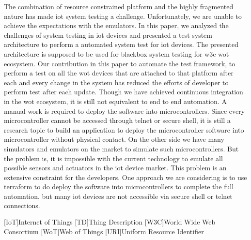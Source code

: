\documentclass[conference]{IEEEtran}
\theoremstyle{definition}
\begin{document}
The combination of resource constrained platform and the highly fragmented nature has made \ac{iot} system testing a challenge.
Unfortunately, we are unable to achieve the expectations with the emulators.
In this paper, we analyzed the challenges of system testing in \ac{iot} devices and presented a test system architecture to perform a automated system test for \ac{iot} devices.
The presented architecture is supposed to be used for blackbox system testing for \ac{w3c} \ac{wot} ecosystem. 
Our contribution in this paper to automate the test framework, to perform a test on all the \ac{wot} devices that are attached to that platform after each and every change in the system has reduced the efforts of developer to perform test after each update.
Though we have achieved continuous integration in the \ac{wot} ecosystem, it is still not equivalent to end to end automation.
A manual work is required to deploy the software into microcontrollers. 
Since every microcontroller cannot be accessed through telnet or secure shell, it is still a research topic to build an application to deploy the microcontroller software into microcontroller without physical contact. 
On the other side we have many simulators and emulators on the market to simulate such microcontrollers. 
But the problem is, it is impossible with the current technology to emulate all possible sensors and actuators in the \ac{iot} device market. 
This problem is an extensive constraint for the developers.
One approach we are considering is to use terraform to do deploy the software into microcontrollers to complete the full automation, but many \ac{iot} devices are not accessible via secure shell or telnet connections.  



\begin{acronym}[ECU]
[IoT]{Internet of Things}
[TD]{Thing Description}
[W3C]{World Wide Web Consortium}
[WoT]{Web of Things}
[URI]{Uniform Resource Identifier}
\end{acronym}

%



\end{document}
